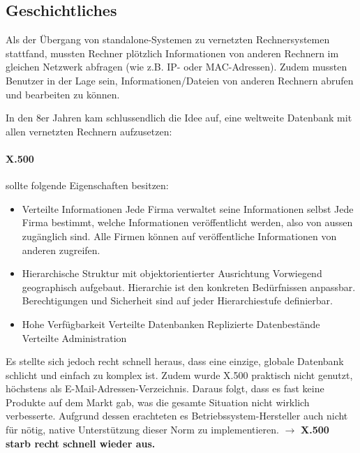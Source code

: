 \documentclass[a4paper, 11pt]{article}
\begin{document}
\subsection{Geschichtliches}
Als der Übergang von standalone-Systemen zu vernetzten Rechnersystemen stattfand, mussten Rechner plötzlich Informationen von anderen Rechnern im gleichen Netzwerk abfragen (wie z.B. IP- oder MAC-Adressen). Zudem mussten Benutzer in der Lage sein, Informationen/Dateien von anderen Rechnern abrufen und bearbeiten zu können. 

In den 8er Jahren kam schlussendlich die Idee auf, eine weltweite Datenbank mit allen vernetzten Rechnern aufzusetzen:

\paragraph{X.500} sollte folgende Eigenschaften besitzen:
\begin{itemize}
	\item Verteilte Informationen
	\subitem Jede Firma verwaltet seine Informationen selbst
	\subitem Jede Firma bestimmt, welche Informationen veröffentlicht werden, also von aussen zugänglich sind.
	\subitem Alle Firmen können auf veröffentliche Informationen von anderen zugreifen.
	\item Hierarchische Struktur mit objektorientierter Ausrichtung
	\subitem Vorwiegend geographisch aufgebaut.
	\subitem Hierarchie ist den konkreten Bedürfnissen anpassbar.
	\subitem Berechtigungen und Sicherheit sind auf jeder Hierarchiestufe definierbar.
	\item Hohe Verfügbarkeit
	\subitem Verteilte Datenbanken 
	\subitem Replizierte Datenbestände
	\subitem Verteilte Administration
\end{itemize}

Es stellte sich jedoch recht schnell heraus, dass eine einzige, globale Datenbank schlicht und einfach zu komplex ist. Zudem wurde X.500 praktisch nicht genutzt, höchstens als E-Mail-Adressen-Verzeichnis. Daraus folgt, dass es fast keine Produkte auf dem Markt gab, was die gesamte Situation nicht wirklich verbesserte. Aufgrund dessen erachteten es Betriebssystem-Hersteller auch nicht für nötig, native Unterstützung dieser Norm zu implementieren. $\rightarrow$ \textbf{X.500 starb recht schnell wieder aus.}

\newpage
\end{document}
